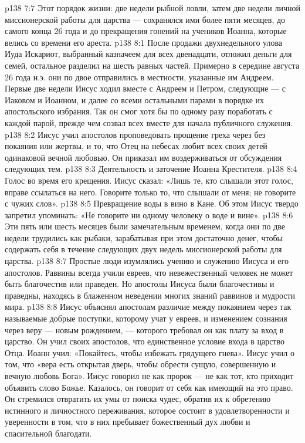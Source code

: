\vs p138 7:7 Этот порядок жизни: две недели рыбной ловли, затем две недели личной миссионерской работы для царства --- сохранялся ими более пяти месяцев, до самого конца 26 года и до прекращения гонений на учеников Иоанна, которые велись со времени его ареста.
\vs p138 8:1 После продажи двухнедельного улова Иуда Искариот, выбранный казначеем для всех двенадцати, отложил деньги для семей, остальное разделил на шесть равных частей. Примерно в середине августа 26 года н.э. они по двое отправились в местности, указанные им Андреем. Первые две недели Иисус ходил вместе с Андреем и Петром, следующие --- с Иаковом и Иоанном, и далее со всеми остальными парами в порядке их апостольского избрания. Так он смог хотя бы по одному разу поработать с каждой парой, прежде чем созвал всех вместе для начала публичного служения.
\vs p138 8:2 Иисус учил апостолов проповедовать прощение греха через  без покаяния или жертвы, и то, что Отец на небесах любит всех своих детей одинаковой вечной любовью. Он приказал им воздерживаться от обсуждения следующих тем.
\vs p138 8:3 \bibnobreakspace Деятельность и заточение Иоанна Крестителя.
\vs p138 8:4 \pc {}\bibnobreakspace Голос во время его крещения. Иисус сказал: «Лишь те, кто слышали этот голос, вправе ссылаться на него. Говорите только то, что слышали от меня; не говорите с чужих слов».
\vs p138 8:5 \pc {}\bibnobreakspace Превращение воды в вино в Кане. Об этом Иисус твердо запретил упоминать: «Не говорите ни одному человеку о воде и вине».
\vs p138 8:6 \pc Эти пять или шесть месяцев были замечательным временем, когда они по две недели трудились как рыбаки, зарабатывая при этом достаточно денег, чтобы содержать себя в течение следующих двух недель миссионерской работы для царства.
\vs p138 8:7 Простые люди изумлялись учению и служению Иисуса и его апостолов. Раввины всегда учили евреев, что невежественный человек не может быть благочестив или праведен. Но апостолы Иисуса были благочестивы и праведны, находясь в блаженном неведении многих знаний раввинов и мудрости мира.
\vs p138 8:8 \pc Иисус объяснял апостолам различие между покаянием через так называемые добрые поступки, которому учат у евреев, и изменением сознания через веру --- новым рождением, --- которого требовал он как плату за вход в царство. Он учил своих апостолов, что  единственное условие входа в царство Отца. Иоанн учил: «Покайтесь, чтобы избежать грядущего гнева». Иисус учил о том, что «вера есть открытая дверь, чтобы обрести сущую, совершенную и вечную любовь Бога». Иисус говорил не как пророк --- не как тот, кто приходит объявить слово Божье. Казалось, он говорит от себя как имеющий на это право. Он стремился отвратить их умы от поиска чудес, обратив их к обретению истинного и личностного переживания, которое состоит в удовлетворенности и уверенности в том, что в них пребывает божественный дух любви и спасительной благодати.

